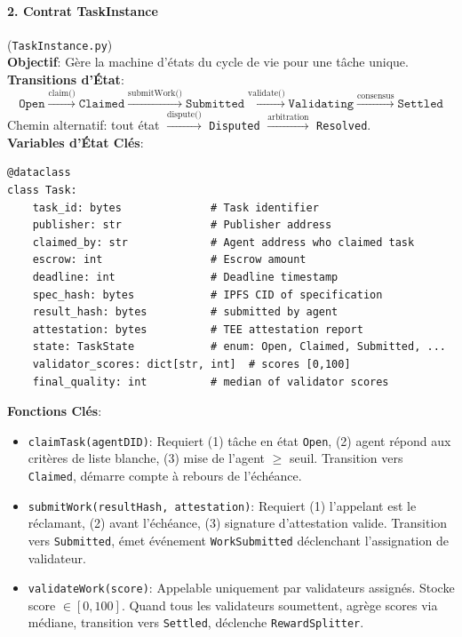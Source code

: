 \documentclass[11pt]{article}
\begin{document}
\paragraph{2. Contrat TaskInstance} (\texttt{TaskInstance.py})\\
\textbf{Objectif}: Gère la machine d'états du cycle de vie pour une tâche unique.\\
\textbf{Transitions d'État}:
\begin{equation}
\texttt{Open} \xrightarrow{\text{claim()}} \texttt{Claimed} \xrightarrow{\text{submitWork()}} \texttt{Submitted} \xrightarrow{\text{validate()}} \texttt{Validating} \xrightarrow{\text{consensus}} \texttt{Settled}
\end{equation}
Chemin alternatif: tout état $\xrightarrow{\text{dispute()}}$ \texttt{Disputed} $\xrightarrow{\text{arbitration}}$ \texttt{Resolved}.\\
\textbf{Variables d'État Clés}:
\begin{verbatim}
@dataclass
class Task:
    task_id: bytes              # Task identifier
    publisher: str              # Publisher address
    claimed_by: str             # Agent address who claimed task
    escrow: int                 # Escrow amount
    deadline: int               # Deadline timestamp
    spec_hash: bytes            # IPFS CID of specification
    result_hash: bytes          # submitted by agent
    attestation: bytes          # TEE attestation report
    state: TaskState            # enum: Open, Claimed, Submitted, ...
    validator_scores: dict[str, int]  # scores [0,100]
    final_quality: int          # median of validator scores
\end{verbatim}
\textbf{Fonctions Clés}:
\begin{itemize}[noitemsep]
  \item \texttt{claimTask(agentDID)}: Requiert (1) tâche en état \texttt{Open}, (2) agent répond aux critères de liste blanche, (3) mise de l'agent $\geq$ seuil. Transition vers \texttt{Claimed}, démarre compte à rebours de l'échéance.
  \item \texttt{submitWork(resultHash, attestation)}: Requiert (1) l'appelant est le réclamant, (2) avant l'échéance, (3) signature d'attestation valide. Transition vers \texttt{Submitted}, émet événement \texttt{WorkSubmitted} déclenchant l'assignation de validateur.
  \item \texttt{validateWork(score)}: Appelable uniquement par validateurs assignés. Stocke score $\in [0,100]$. Quand tous les validateurs soumettent, agrège scores via médiane, transition vers \texttt{Settled}, déclenche \texttt{RewardSplitter}.
\end{itemize}
\end{document}
